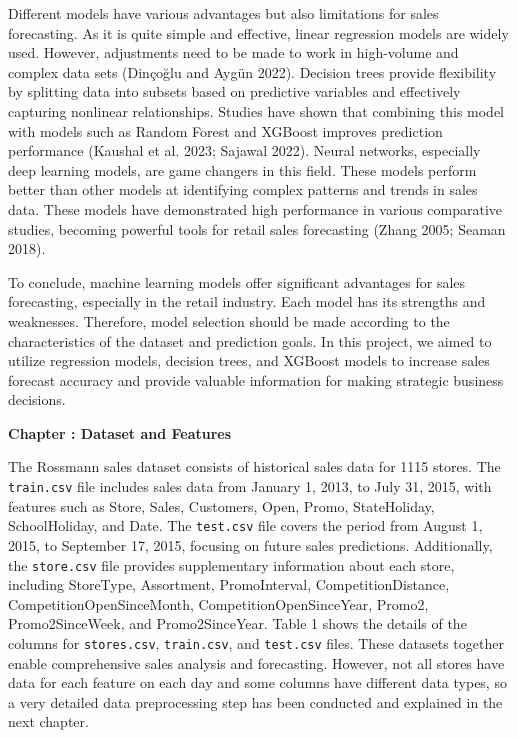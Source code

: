 \documentclass{article}
\newcounter{chapter}
\renewcommand{\thechapter}{\arabic{chapter}}
\newcommand{\mychapter}[1]{
    \stepcounter{chapter}
    \clearpage %
    \noindent
    \begin{center}
        \LARGE\bfseries Chapter \thechapter: #1
    \end{center}
    \vspace{0.25in} %
}
\begin{document}
Different models have various advantages but also limitations for sales forecasting. As it is quite simple and effective, linear regression models are widely used. However, adjustments need to be made to work in high-volume and complex data sets (Dinçoğlu and Aygün 2022). Decision trees provide flexibility by splitting data into subsets based on predictive variables and effectively capturing nonlinear relationships. Studies have shown that combining this model with models such as Random Forest and XGBoost improves prediction performance (Kaushal et al. 2023; Sajawal 2022). Neural networks, especially deep learning models, are game changers in this field. These models perform better than other models at identifying complex patterns and trends in sales data. These models have demonstrated high performance in various comparative studies, becoming powerful tools for retail sales forecasting (Zhang 2005; Seaman 2018).

To conclude, machine learning models offer significant advantages for sales forecasting, especially in the retail industry. Each model has its strengths and weaknesses. Therefore, model selection should be made according to the characteristics of the dataset and prediction goals. In this project, we aimed to utilize regression models, decision trees, and XGBoost models to increase sales forecast accuracy and provide valuable information for making strategic business decisions.

\mychapter{Dataset and Features}
The Rossmann sales dataset consists of historical sales data for 1115 stores. The \texttt{train.csv} file includes sales data from January 1, 2013, to July 31, 2015, with features such as Store, Sales, Customers, Open, Promo, StateHoliday, SchoolHoliday, and Date. The \texttt{test.csv} file covers the period from August 1, 2015, to September 17, 2015, focusing on future sales predictions. Additionally, the \texttt{store.csv} file provides supplementary information about each store, including StoreType, Assortment, PromoInterval, CompetitionDistance, CompetitionOpenSinceMonth, CompetitionOpenSinceYear, Promo2, Promo2SinceWeek, and Promo2SinceYear. Table 1 shows the details of the columns for \texttt{stores.csv}, \texttt{train.csv}, and \texttt{test.csv} files. These datasets together enable comprehensive sales analysis and forecasting. However, not all stores have data for each feature on each day and some columns have different data types, so a very detailed data preprocessing step has been conducted and explained in the next chapter.
\end{document}
